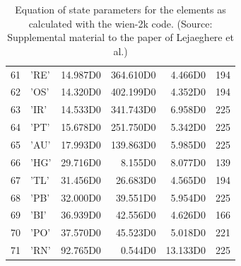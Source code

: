 \documentclass[11pt,a4paper]{report}
\begin{document}
\begin{table}[ht]
\begin{center}
\begin{tabular}{|r|l|r|r|r|r|}
 61 & 'RE'&    14.987D0&   364.610D0&     4.466D0&194 \\
 62 & 'OS'&    14.320D0&   402.199D0&     4.352D0&194 \\
 63 & 'IR'&    14.533D0&   341.743D0&     6.958D0&225 \\
 64 & 'PT'&    15.678D0&   251.750D0&     5.342D0&225 \\
 65 & 'AU'&    17.993D0&   139.863D0&     5.985D0&225 \\
 66 & 'HG'&    29.716D0&     8.155D0&     8.077D0&139 \\
 67 & 'TL'&    31.456D0&    26.683D0&     4.565D0&194 \\
 68 & 'PB'&    32.000D0&    39.551D0&     5.954D0&225 \\
 69 & 'BI'&    36.939D0&    42.556D0&     4.626D0&166 \\
 70 & 'PO'&    37.570D0&    45.523D0&     5.018D0&221 \\
 71 & 'RN'&    92.765D0&     0.544D0&    13.133D0&225 \\
\hline
\end{tabular}
\end{center}
\caption{\label{tab:wieneqs_b}Equation of state parameters for the
  elements as calculated with the wien-2k code. (Source: Supplemental
  material to the paper of Lejaeghere et
  al.\cite{lejaeghere14_critrevsolstmatsci39_1}) }
\end{table}
\end{document}
